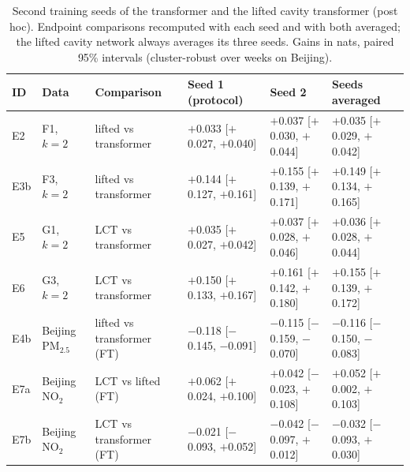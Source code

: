 \begin{table}[h]
\centering\scriptsize
\setlength{\tabcolsep}{2pt}
\caption{\label{tab:seeds}Second training seeds of the transformer and the lifted cavity transformer (post hoc). Endpoint comparisons recomputed with each seed and with both averaged; the lifted cavity network always averages its three seeds. Gains in nats, paired 95\% intervals (cluster-robust over weeks on Beijing).}
\begin{tabular}{llllll}
\toprule
ID & Data & Comparison & Seed 1 (protocol) & Seed 2 & Seeds averaged\\
\midrule
E2 & F1, $k=2$ & lifted vs transformer & $+$0.033 [$+$0.027, $+$0.040] & $+$0.037 [$+$0.030, $+$0.044] & $+$0.035 [$+$0.029, $+$0.042]\\
E3b & F3, $k=2$ & lifted vs transformer & $+$0.144 [$+$0.127, $+$0.161] & $+$0.155 [$+$0.139, $+$0.171] & $+$0.149 [$+$0.134, $+$0.165]\\
E5 & G1, $k=2$ & LCT vs transformer & $+$0.035 [$+$0.027, $+$0.042] & $+$0.037 [$+$0.028, $+$0.046] & $+$0.036 [$+$0.028, $+$0.044]\\
E6 & G3, $k=2$ & LCT vs transformer & $+$0.150 [$+$0.133, $+$0.167] & $+$0.161 [$+$0.142, $+$0.180] & $+$0.155 [$+$0.139, $+$0.172]\\
E4b & Beijing PM$_{2.5}$ & lifted vs transformer (FT) & $-$0.118 [$-$0.145, $-$0.091] & $-$0.115 [$-$0.159, $-$0.070] & $-$0.116 [$-$0.150, $-$0.083]\\
E7a & Beijing NO$_2$ & LCT vs lifted (FT) & $+$0.062 [$+$0.024, $+$0.100] & $+$0.042 [$-$0.023, $+$0.108] & $+$0.052 [$+$0.002, $+$0.103]\\
E7b & Beijing NO$_2$ & LCT vs transformer (FT) & $-$0.021 [$-$0.093, $+$0.052] & $-$0.042 [$-$0.097, $+$0.012] & $-$0.032 [$-$0.093, $+$0.030]\\
\bottomrule
\end{tabular}
\end{table}
